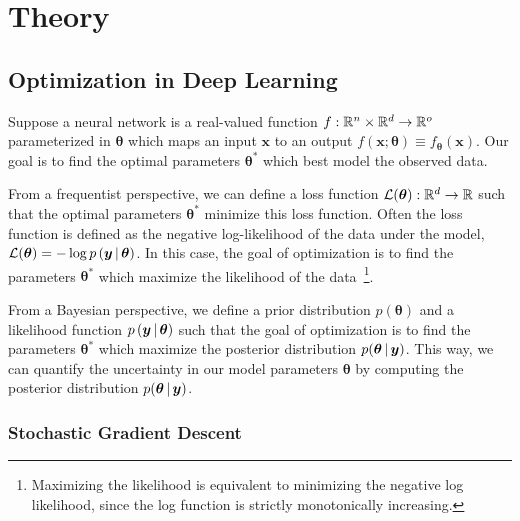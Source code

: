 \chapter{Theory}

\section{Optimization in Deep Learning}

Suppose a neural network is a real-valued function \(f: \mathbb{R}^n \times \mathbb{R}^d \rightarrow \mathbb{R}^o\) parameterized in \(\bm\theta\) which maps an input \(\bm x\) to an output \(f(\bm x; \bm\theta) \equiv f_{\bm\theta}(\bm x)\).
Our goal is to find the optimal parameters \(\bm\theta^*\) which best model the observed data.

From a frequentist perspective, we can define a loss function \(\mathcal{L}(\bm\theta): \mathbb{R}^d \rightarrow \mathbb{R}\) such that the optimal parameters \(\bm\theta^*\) minimize this loss function.
Often the loss function is defined as the negative log-likelihood of the data under the model, \(\mathcal{L}(\bm\theta) = -\log p\left(\bm y \, | \, \bm \theta\right)\).
In this case, the goal of optimization is to find the parameters \(\bm\theta^*\) which maximize the likelihood of the data~\footnote{Maximizing the likelihood is equivalent to minimizing the negative log likelihood, since the log function is strictly monotonically increasing.}.

From a Bayesian perspective, we define a prior distribution \(p(\bm\theta)\) and a likelihood function \(p\left(\bm y \, | \, \bm \theta\right)\) such that the goal of optimization is to find the parameters \(\bm\theta^*\) which maximize the posterior distribution \(p(\bm\theta \, | \, \bm y)\).
This way, we can quantify the uncertainty in our model parameters \(\bm\theta\) by computing the posterior distribution \(p(\bm\theta \, | \, \bm y)\).

\subsection{Stochastic Gradient Descent}

